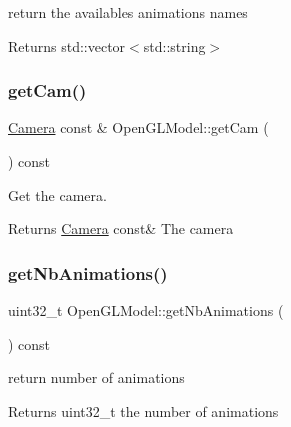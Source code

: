 return the availables animations names 

\begin{DoxyReturn}{Returns}
std\+::vector$<$std\+::string$>$ 
\end{DoxyReturn}
\mbox{\label{class_open_g_l_model_aec911d785c7eab28ab2de3787d331290}} 
\subsubsection{\texorpdfstring{get\+Cam()}{getCam()}}
{\footnotesize\ttfamily \hyperlink{class_camera}{Camera} const  \& Open\+G\+L\+Model\+::get\+Cam (\begin{DoxyParamCaption}{ }\end{DoxyParamCaption}) const}



Get the camera. 

\begin{DoxyReturn}{Returns}
\hyperlink{class_camera}{Camera} const\& The camera 
\end{DoxyReturn}
\mbox{\label{class_open_g_l_model_a0f2a5be64c50e5e5fc680575cd5e710c}} 
\subsubsection{\texorpdfstring{get\+Nb\+Animations()}{getNbAnimations()}}
{\footnotesize\ttfamily uint32\+\_\+t Open\+G\+L\+Model\+::get\+Nb\+Animations (\begin{DoxyParamCaption}{ }\end{DoxyParamCaption}) const}



return number of animations 

\begin{DoxyReturn}{Returns}
uint32\+\_\+t the number of animations 
\end{DoxyReturn}
\mbox{\label{class_open_g_l_model_ac7acbc5f8890c277e01fbad776ebe368}} 
